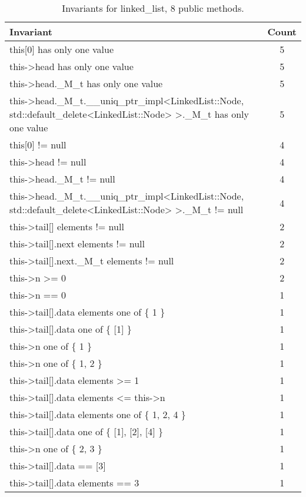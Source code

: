 \begin{table}[ht]
\centering
\scriptsize
\caption{Invariants for linked\_list, 8 public methods.}
\label{linked_list_daikon}
\begin{tabular}{|l|c|}
\hline
Invariant & Count \\
\hline
this[0] has only one value & 5 \\
this->head has only one value & 5 \\
this->head.\_M\_t has only one value & 5 \\
this->head.\_M\_t.\_\_uniq\_ptr\_impl<LinkedList::Node, std::default\_delete<LinkedList::Node> >.\_M\_t has only one value & 5 \\
this[0] != null & 4 \\
this->head != null & 4 \\
this->head.\_M\_t != null & 4 \\
this->head.\_M\_t.\_\_uniq\_ptr\_impl<LinkedList::Node, std::default\_delete<LinkedList::Node> >.\_M\_t != null & 4 \\
this->tail[] elements != null & 2 \\
this->tail[].next elements != null & 2 \\
this->tail[].next.\_M\_t elements != null & 2 \\
this->n >= 0 & 2 \\
this->n == 0 & 1 \\
this->tail[].data elements one of \{ 1 \} & 1 \\
this->tail[].data one of \{ [1] \} & 1 \\
this->n one of \{ 1 \} & 1 \\
this->n one of \{ 1, 2 \} & 1 \\
this->tail[].data elements >= 1 & 1 \\
this->tail[].data elements <= this->n & 1 \\
this->tail[].data elements one of \{ 1, 2, 4 \} & 1 \\
this->tail[].data one of \{ [1], [2], [4] \} & 1 \\
this->n one of \{ 2, 3 \} & 1 \\
this->tail[].data == [3] & 1 \\
this->tail[].data elements == 3 & 1 \\
\hline
\end{tabular}
\end{table}

